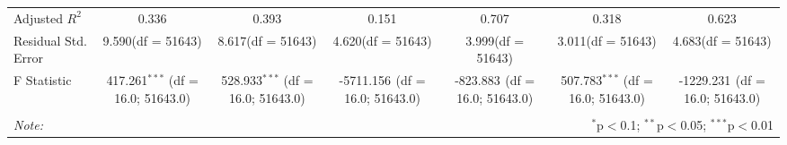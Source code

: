 \begin{table}[!htbp]
\begin{tabular}{@{\extracolsep{5pt}}lcccccc}
 Adjusted $R^2$ & 0.336 & 0.393 & 0.151 & 0.707 & 0.318 & 0.623 \\
 Residual Std. Error & 9.590(df = 51643) & 8.617(df = 51643) & 4.620(df = 51643) & 3.999(df = 51643) & 3.011(df = 51643) & 4.683(df = 51643)  \\
 F Statistic & 417.261$^{***}$ (df = 16.0; 51643.0) & 528.933$^{***}$ (df = 16.0; 51643.0) & -5711.156$^{}$ (df = 16.0; 51643.0) & -823.883$^{}$ (df = 16.0; 51643.0) & 507.783$^{***}$ (df = 16.0; 51643.0) & -1229.231$^{}$ (df = 16.0; 51643.0) \\
\hline
\hline \\[-1.8ex]
\textit{Note:} & \multicolumn{6}{r}{$^{*}$p$<$0.1; $^{**}$p$<$0.05; $^{***}$p$<$0.01} \\
\end{tabular}
\end{table}